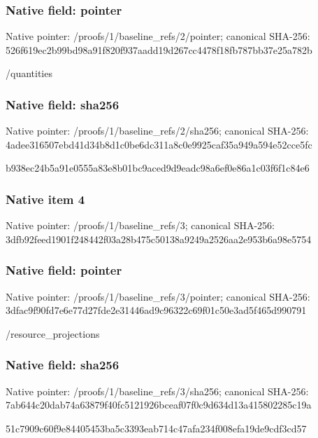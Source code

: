\documentclass[10pt,a4paper]{article}
\begin{document}
\subsubsection{Native field: pointer}
Native pointer: /proofs/1/baseline\_\allowbreak{}refs/2/pointer; canonical SHA-256: 526f619ec2b99bd98a91f820f937aadd19d267cc4478f18fb787bb37e25a782b

\begingroup\raggedright\sloppy /\allowbreak{}quantities\par\endgroup

\subsubsection{Native field: sha256}
Native pointer: /proofs/1/baseline\_\allowbreak{}refs/2/sha256; canonical SHA-256: 4adee316507ebd41d34b8d1c0be6dc311a8c0e9925caf35a949a594e52cce5fc

\begingroup\raggedright\sloppy b938ec24b5a91e0555a83e8b01bc9aced9d9eadc98a6ef0e86a1c03f6f1c84e6\par\endgroup

\subsubsection{Native item 4}
Native pointer: /proofs/1/baseline\_\allowbreak{}refs/3; canonical SHA-256: 3dfb92feed1901f248442f03a28b475c50138a9249a2526aa2e953b6a98e5754

\subsubsection{Native field: pointer}
Native pointer: /proofs/1/baseline\_\allowbreak{}refs/3/pointer; canonical SHA-256: 3dfac9f90fd7e6e77d27fde2e31446ad9c96322c69f01c50e3ad5f465d990791

\begingroup\raggedright\sloppy /\allowbreak{}resource\_\allowbreak{}projections\par\endgroup

\subsubsection{Native field: sha256}
Native pointer: /proofs/1/baseline\_\allowbreak{}refs/3/sha256; canonical SHA-256: 7ab644c20dab74a63879f40fc5121926bceaf07f0c9d634d13a415802285c19a

\begingroup\raggedright\sloppy 51c7909c60f9e84405453ba5c3393eab714c47afa234f008efa19de9cdf3cd57\par\endgroup
\end{document}
